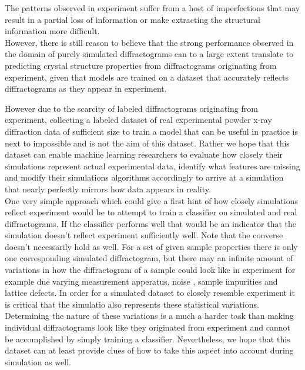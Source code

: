The patterns observed in experiment suffer from a host of imperfections that may result in a partial loss of information or make extracting the structural information more difficult. \\
However, there is still reason to believe that the strong performance observed in the domain of purely simulated diffractograms can to a large extent translate to predicting crystal structure properties from diffractograms originating from experiment, given that models are trained on a dataset that accurately reflects diffractograms as they appear in experiment.

However due to the scarcity of labeled diffractograms originating from experiment, collecting a labeled dataset
of real experimental powder x-ray diffraction data of sufficient size to train a model
that can be useful in practice is next to impossible and is not the aim of this dataset.
Rather we hope that this dataset can enable machine learning researchers to evaluate how closely their simulations
represent actual experimental data, identify what features are missing and modify their simulations algorithms
accordingly to arrive at a simulation that nearly perfectly mirrors how data appears in reality.\\
One very simple approach which could give a first hint of how closely simulations reflect experiment would be to attempt
to train a classifier on simulated and real diffractograms.
If the classifier performs well that would be an indicator that the simulation doesn't reflect experiment sufficiently well.
Note that the converse doesn't necessarily hold as well.
For a set of given sample properties there is only one corresponding simulated diffractogram, but there may an infinite amount of
variations in how the diffractogram of a sample could look like in experiment for example due varying measurement apperatus, noise
, sample impurities and lattice defects.
In order for a simulated dataset to closely resemble experiment it is critical that the simulatio also represents these
statistical variations.
Determining the nature of these variations is a much a harder task than making individual diffractograms look like they
originated from experiment and cannot be accomplished by simply training a classifier.
Nevertheless, we hope that this dataset can at least provide clues of how to take this aspect into account during
simulation as well.\\

